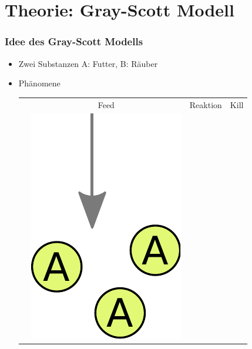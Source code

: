 \documentclass[aspectratio=32]{beamer}
\newcommand{\blob}{\rule[2.2pt]{3pt}{3pt}}
\newcommand{\sectionframe}{\begin{frame}
	\begin{center}
		\textcolor{simtechred}{\Large\insertsection}
	\end{center}
\end{frame}}
\newcommand{\reditem}{\item[\textcolor{simtechred}{$\blob$}]}
\begin{document}
\section{Theorie: Gray-Scott Modell}
\sectionframe

\begin{frame}
\frametitle{Idee des Gray-Scott Modells}
\begin{itemize}
  \reditem Zwei Substanzen A: Futter, B: Räuber
  \reditem Phänomene
\begin{tabular}{ r c c c }
	& Feed & Reaktion & Kill \\
	&
  \includegraphics[height=\textwidth/12,keepaspectratio]{Bilder/gs_feed.pdf}
	&

\end{tabular}
\end{itemize}
\end{frame}
\end{document}
